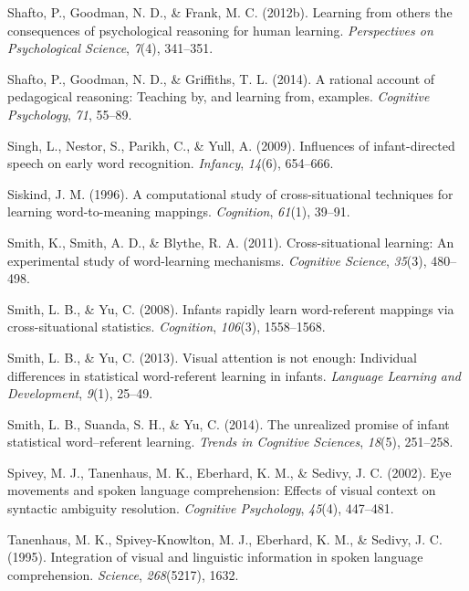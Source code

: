 \documentclass[oneside]{report}
\begin{document}
\hypertarget{ref-shafto2012learning}{}
Shafto, P., Goodman, N. D., \& Frank, M. C. (2012b). Learning from
others the consequences of psychological reasoning for human learning.
\emph{Perspectives on Psychological Science}, \emph{7}(4), 341--351.

\hypertarget{ref-shafto2014rational}{}
Shafto, P., Goodman, N. D., \& Griffiths, T. L. (2014). A rational
account of pedagogical reasoning: Teaching by, and learning from,
examples. \emph{Cognitive Psychology}, \emph{71}, 55--89.

\hypertarget{ref-singh2009influences}{}
Singh, L., Nestor, S., Parikh, C., \& Yull, A. (2009). Influences of
infant-directed speech on early word recognition. \emph{Infancy},
\emph{14}(6), 654--666.

\hypertarget{ref-siskind1996computational}{}
Siskind, J. M. (1996). A computational study of cross-situational
techniques for learning word-to-meaning mappings. \emph{Cognition},
\emph{61}(1), 39--91.

\hypertarget{ref-smith2011cross}{}
Smith, K., Smith, A. D., \& Blythe, R. A. (2011). Cross-situational
learning: An experimental study of word-learning mechanisms.
\emph{Cognitive Science}, \emph{35}(3), 480--498.

\hypertarget{ref-smith2008infants}{}
Smith, L. B., \& Yu, C. (2008). Infants rapidly learn word-referent
mappings via cross-situational statistics. \emph{Cognition},
\emph{106}(3), 1558--1568.

\hypertarget{ref-smith2013visual}{}
Smith, L. B., \& Yu, C. (2013). Visual attention is not enough:
Individual differences in statistical word-referent learning in infants.
\emph{Language Learning and Development}, \emph{9}(1), 25--49.

\hypertarget{ref-smith2014unrealized}{}
Smith, L. B., Suanda, S. H., \& Yu, C. (2014). The unrealized promise of
infant statistical word--referent learning. \emph{Trends in Cognitive
Sciences}, \emph{18}(5), 251--258.

\hypertarget{ref-spivey2002eye}{}
Spivey, M. J., Tanenhaus, M. K., Eberhard, K. M., \& Sedivy, J. C.
(2002). Eye movements and spoken language comprehension: Effects of
visual context on syntactic ambiguity resolution. \emph{Cognitive
Psychology}, \emph{45}(4), 447--481.

\hypertarget{ref-tanenhaus1995integration}{}
Tanenhaus, M. K., Spivey-Knowlton, M. J., Eberhard, K. M., \& Sedivy, J.
C. (1995). Integration of visual and linguistic information in spoken
language comprehension. \emph{Science}, \emph{268}(5217), 1632.
\end{document}
